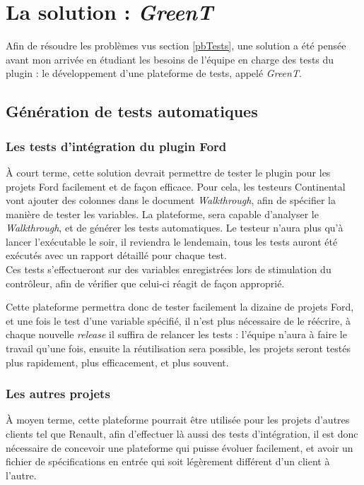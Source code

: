 	\section{La solution : \textit{GreenT}}
	Afin de résoudre les problèmes vus section \ref{pbTests}, une solution a été pensée avant mon arrivée en étudiant les besoins de l'équipe en charge des tests du plugin : le développement d'une plateforme de tests, appelé \textit{GreenT}.

	\subsection{Génération de tests automatiques}
	\subsubsection{Les tests d'intégration du plugin Ford}
	À court terme, cette solution devrait permettre de tester le plugin pour les projets Ford facilement et de façon efficace. Pour cela, les testeurs Continental vont ajouter des colonnes dans le document \textit{Walkthrough}, afin de spécifier la manière de tester les variables. La plateforme, sera capable d'analyser le \textit{Walkthrough}, et de générer les tests automatiques. Le testeur n'aura plus qu'à lancer l'exécutable le soir, il reviendra le lendemain, tous les tests auront été exécutés avec un rapport détaillé pour chaque test.\\

	Ces tests s'effectueront sur des variables enregistrées lors de stimulation du contrôleur, afin de vérifier que celui-ci réagit de façon approprié.

	Cette plateforme permettra donc de tester facilement la dizaine de projets Ford, et une fois le test d'une variable spécifié, il n'est plus nécessaire de le réécrire, à chaque nouvelle \textit{release} il suffira de relancer les tests : l'équipe n'aura à faire le travail qu'une fois, ensuite la réutilisation sera possible, les projets seront testés plus rapidement, plus efficacement, et plus souvent.

	\subsubsection{Les autres projets}
	À moyen terme, cette plateforme pourrait être utilisée pour les projets d'autres clients tel que Renault, afin d'effectuer là aussi des tests d'intégration, il est donc nécessaire de concevoir une plateforme qui puisse évoluer facilement, et avoir un fichier de spécifications en entrée qui soit légèrement différent d'un client à l'autre.

